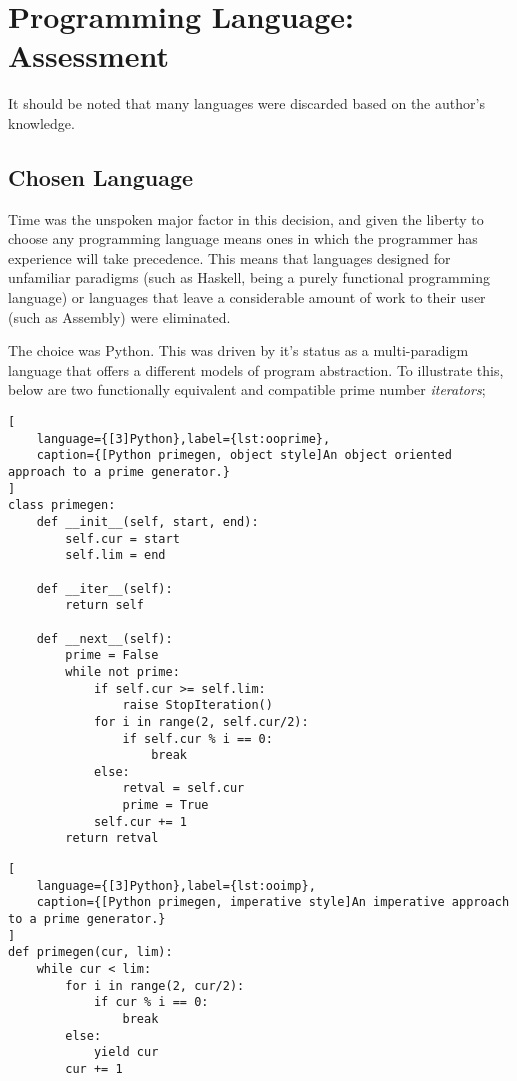 \documentclass[10pt,a4paper,notitlepage]{report}
\begin{document}
\section{Programming Language: Assessment}
It should be noted that many languages were discarded based on the author's knowledge.

\subsection{}
\subsection{Chosen Language}
Time was the unspoken major factor in this decision, and given the liberty to choose any programming language means ones in which the programmer has experience will take precedence. This means that languages designed for unfamiliar paradigms (such as Haskell, being a purely functional programming language\cite{haskfunc}) or languages that leave a considerable amount of work to their user (such as Assembly) were eliminated.

The choice was Python. This was driven by it's status as a multi-paradigm language that offers a different models of program abstraction.
To illustrate this, below are two functionally equivalent and compatible prime number \emph{iterators};
\begin{lstlisting}[
	language={[3]Python},label={lst:ooprime},
	caption={[Python primegen, object style]An object oriented approach to a prime generator.}
]
class primegen:
    def __init__(self, start, end):
        self.cur = start
        self.lim = end

    def __iter__(self):
        return self

    def __next__(self):
        prime = False
        while not prime:
            if self.cur >= self.lim:
                raise StopIteration()
            for i in range(2, self.cur/2):
                if self.cur % i == 0:
                    break
            else:
                retval = self.cur
                prime = True
            self.cur += 1
        return retval
\end{lstlisting}

\begin{lstlisting}[
	language={[3]Python},label={lst:ooimp},
	caption={[Python primegen, imperative style]An imperative approach to a prime generator.}
]
def primegen(cur, lim):
    while cur < lim:
        for i in range(2, cur/2):
            if cur % i == 0:
                break
        else:
            yield cur
        cur += 1

\end{lstlisting}
\end{document}
